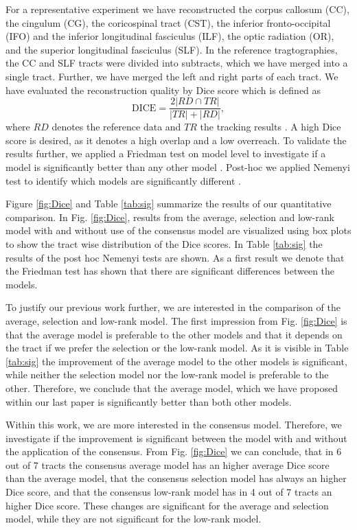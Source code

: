 For a representative experiment we have reconstructed the corpus callosum (CC), the
cingulum (CG), the coricospinal tract (CST), the inferior fronto-occipital (IFO)
and the inferior longitudinal fasciculus (ILF), the optic radiation (OR), and
the superior longitudinal fasciculus (SLF). In the reference tragtographies, the
CC and SLF tracts were divided into subtracts, which we have merged into a single
tract. Further, we have merged the left and right parts of each tract. We have
evaluated the reconstruction quality by Dice score which is defined as
\[ 
	\text{DICE} = \frac{2 |RD \cap TR |}{|TR| + |RD|} ,
\]
where $RD$ denotes the reference data and $TR$ the tracking results
\cite{SCHILLING2019194}. A high Dice score is desired, as it denotes a high
overlap and a low overreach. To validate the results further, we applied a
Friedman test on model level to investigate if a model is significantly better
than any other model \cite{doi:10.1080/01621459.1937.10503522}. Post-hoc we
applied Nemenyi test to identify which models are significantly different
\cite{Nemenyi}.  


Figure \ref{fig:Dice} and Table \ref{tab:sig} summarize the results of our
quantitative comparison. In Fig. \ref{fig:Dice}, results from the average,
selection and low-rank model with and without use of the consensus model are
visualized using box plots to show the tract wise distribution of the Dice
scores. In Table \ref{tab:sig} the results of the post hoc Nemenyi tests are
shown. As a first result we denote that the Friedman test has shown that there
are significant differences between the models. 

To justify our previous work further, we are interested in the comparison of the
average, selection and low-rank model. The first impression from Fig.
\ref{fig:Dice} is that the average model is preferable to the other models and
that it depends on the tract if we prefer the selection or the low-rank model.
As it is visible in Table \ref{tab:sig} the improvement of the average model to
the other models is significant, while neither the selection model nor the
low-rank model is preferable to
the other. Therefore, we conclude that the average model, which we have proposed
within our last paper is significantly better than both other models. 

Within this work, we are more interested in the consensus model. Therefore, we
investigate if the improvement is significant between the model with and without
the application of the consensus. From Fig. \ref{fig:Dice} we can conclude, that
in 6 out of 7 tracts the consensus average model has an higher average Dice
score than the average model, that the consensus selection model has always an
higher Dice score, and that the consensus low-rank model has in 4 out of 7
tracts an higher Dice score. These changes are significant for the average and
selection model, while they are not significant for the low-rank model. 

